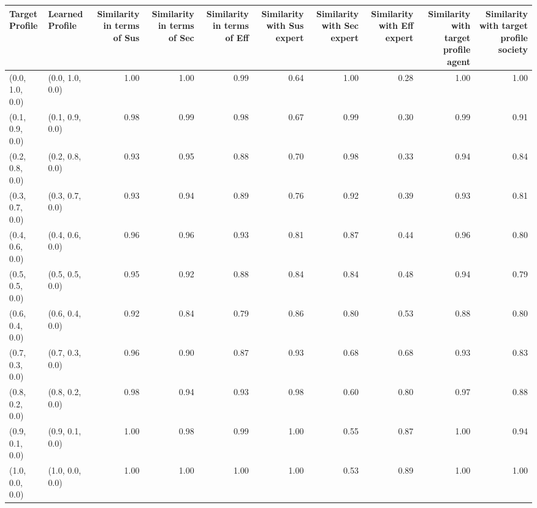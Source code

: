 \begin{tabular}{llrrrrrrrr}
\toprule
Target Profile & Learned Profile & Similarity in terms of Sus & Similarity in terms of Sec & Similarity in terms of Eff & Similarity with Sus expert & Similarity with Sec expert & Similarity with Eff expert & Similarity with target profile agent & Similarity with target profile society \\
\midrule
(0.0, 1.0, 0.0) & (0.0, 1.0, 0.0) & 1.00 & 1.00 & 0.99 & 0.64 & 1.00 & 0.28 & 1.00 & 1.00 \\
(0.1, 0.9, 0.0) & (0.1, 0.9, 0.0) & 0.98 & 0.99 & 0.98 & 0.67 & 0.99 & 0.30 & 0.99 & 0.91 \\
(0.2, 0.8, 0.0) & (0.2, 0.8, 0.0) & 0.93 & 0.95 & 0.88 & 0.70 & 0.98 & 0.33 & 0.94 & 0.84 \\
(0.3, 0.7, 0.0) & (0.3, 0.7, 0.0) & 0.93 & 0.94 & 0.89 & 0.76 & 0.92 & 0.39 & 0.93 & 0.81 \\
(0.4, 0.6, 0.0) & (0.4, 0.6, 0.0) & 0.96 & 0.96 & 0.93 & 0.81 & 0.87 & 0.44 & 0.96 & 0.80 \\
(0.5, 0.5, 0.0) & (0.5, 0.5, 0.0) & 0.95 & 0.92 & 0.88 & 0.84 & 0.84 & 0.48 & 0.94 & 0.79 \\
(0.6, 0.4, 0.0) & (0.6, 0.4, 0.0) & 0.92 & 0.84 & 0.79 & 0.86 & 0.80 & 0.53 & 0.88 & 0.80 \\
(0.7, 0.3, 0.0) & (0.7, 0.3, 0.0) & 0.96 & 0.90 & 0.87 & 0.93 & 0.68 & 0.68 & 0.93 & 0.83 \\
(0.8, 0.2, 0.0) & (0.8, 0.2, 0.0) & 0.98 & 0.94 & 0.93 & 0.98 & 0.60 & 0.80 & 0.97 & 0.88 \\
(0.9, 0.1, 0.0) & (0.9, 0.1, 0.0) & 1.00 & 0.98 & 0.99 & 1.00 & 0.55 & 0.87 & 1.00 & 0.94 \\
(1.0, 0.0, 0.0) & (1.0, 0.0, 0.0) & 1.00 & 1.00 & 1.00 & 1.00 & 0.53 & 0.89 & 1.00 & 1.00 \\
\bottomrule
\end{tabular}
